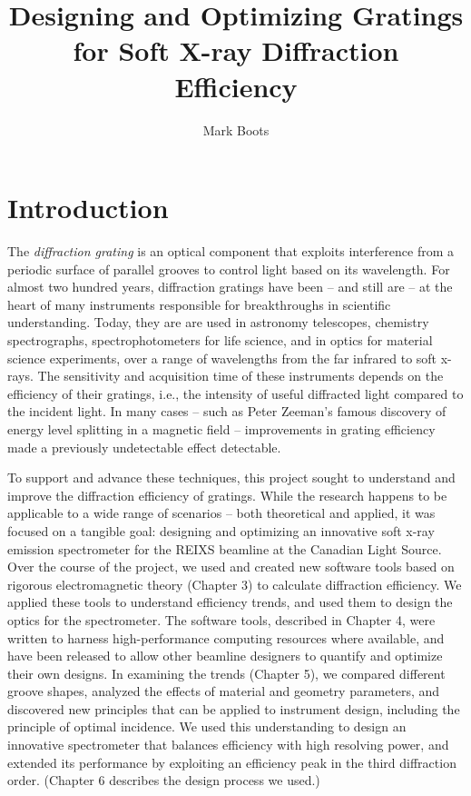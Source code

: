 \documentclass[12pt,bound,twoside,openright,final]{uofsthesis-cs}
\title{Designing and Optimizing Gratings for Soft X-ray Diffraction Efficiency}
\author{Mark Boots}
\begin{document}
\maketitle

\frontmatter


\chapter{Introduction}

The \emph{diffraction grating} is an optical component that exploits interference from a periodic surface of parallel grooves to control light based on its wavelength.  For almost two hundred years, diffraction gratings have been -- and still are -- at the heart of many instruments responsible for breakthroughs in scientific understanding.  Today, they are are used in astronomy telescopes, chemistry spectrographs, spectrophotometers for life science, and in optics for material science experiments, over a range of wavelengths from the far infrared to soft x-rays.  The sensitivity and acquisition time of these instruments depends on the efficiency of their gratings, i.e., the intensity of useful diffracted light compared to the incident light.  In many cases -- such as Peter Zeeman's famous discovery of energy level splitting in a magnetic field -- improvements in grating efficiency made a previously undetectable effect detectable.

To support and advance these techniques, this project sought to understand and improve the diffraction efficiency of gratings.  While the research happens to be applicable to a wide range of scenarios -- both theoretical and applied, it was focused on a tangible goal: designing and optimizing an innovative soft x-ray emission spectrometer for the REIXS beamline at the Canadian Light Source.  Over the course of the project, we used and created new software tools based on rigorous electromagnetic theory (Chapter 3) to calculate diffraction efficiency.  We applied these tools to understand efficiency trends, and used them to design the optics for the spectrometer.  The software tools, described in Chapter 4, were written to harness high-performance computing resources where available, and have been released to allow other beamline designers to quantify and optimize their own designs.  In examining the trends (Chapter 5), we compared different groove shapes, analyzed the effects of material and geometry parameters, and discovered new principles that can be applied to instrument design, including the principle of optimal incidence.  We used this understanding to design an innovative spectrometer that balances efficiency with high resolving power, and extended its performance by exploiting an efficiency peak in the third diffraction order.  (Chapter 6 describes the design process we used.)
\end{document}

